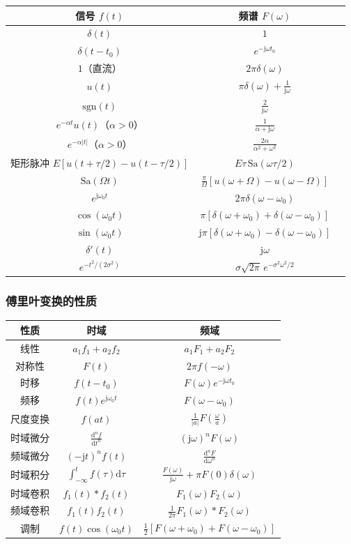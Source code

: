 \documentclass[11pt,a4paper]{ctexart}
\newcommand{\jj}{\mathrm{j}}            %
\newcommand{\dd}{\mathrm{d}}            %
\newcommand{\Sa}{\mathrm{Sa}}           %
\newcommand{\sgn}{\mathrm{sgn}}         %
\newcommand{\dirac}{\delta}             %
\begin{document}
\begin{tabular}{c|c|c}
\toprule
信号 $f(t)$ & 频谱 $F(\omega)$ \\
\midrule
$\dirac(t)$ & $1$ \\
$\dirac(t - t_0)$ & $e^{-\jj\omega t_0}$ \\
$1$（直流） & $2\pi\dirac(\omega)$ \\
$u(t)$ & $\pi\dirac(\omega) + \frac{1}{\jj\omega}$ \\
$\sgn(t)$ & $\frac{2}{\jj\omega}$ \\
$e^{-\alpha t}u(t)$（$\alpha > 0$）& $\frac{1}{\alpha + \jj\omega}$ \\
$e^{-\alpha|t|}$（$\alpha > 0$）& $\frac{2\alpha}{\alpha^2 + \omega^2}$ \\
矩形脉冲 $E[u(t+\tau/2)-u(t-\tau/2)]$ & $E\tau\,\Sa(\omega\tau/2)$ \\
$\Sa(\Omega t)$ & $\frac{\pi}{\Omega}[u(\omega+\Omega)-u(\omega-\Omega)]$ \\
$e^{\jj\omega_0 t}$ & $2\pi\dirac(\omega - \omega_0)$ \\
$\cos(\omega_0 t)$ & $\pi[\dirac(\omega+\omega_0) + \dirac(\omega-\omega_0)]$ \\
$\sin(\omega_0 t)$ & $\jj\pi[\dirac(\omega+\omega_0) - \dirac(\omega-\omega_0)]$ \\
$\dirac'(t)$ & $\jj\omega$ \\
$e^{-t^2/(2\sigma^2)}$ & $\sigma\sqrt{2\pi}\,e^{-\sigma^2\omega^2/2}$ \\
\bottomrule
\end{tabular}

\subsubsection{傅里叶变换的性质}

\begin{longtable}{c|c|c}
\toprule
性质 & 时域 & 频域 \\
\midrule
线性 & $a_1f_1 + a_2f_2$ & $a_1F_1 + a_2F_2$ \\
\midrule
对称性 & $F(t)$ & $2\pi f(-\omega)$ \\
\midrule
时移 & $f(t - t_0)$ & $F(\omega)e^{-\jj\omega t_0}$ \\
\midrule
频移 & $f(t)e^{\jj\omega_0 t}$ & $F(\omega - \omega_0)$ \\
\midrule
尺度变换 & $f(at)$ & $\frac{1}{|a|}F(\frac{\omega}{a})$ \\
\midrule
时域微分 & $\frac{\dd^n f}{\dd t^n}$ & $(\jj\omega)^n F(\omega)$ \\
\midrule
频域微分 & $(-\jj t)^n f(t)$ & $\frac{\dd^n F}{\dd\omega^n}$ \\
\midrule
时域积分 & $\int_{-\infty}^{t} f(\tau)\dd\tau$ & $\frac{F(\omega)}{\jj\omega} + \pi F(0)\dirac(\omega)$ \\
\midrule
时域卷积 & $f_1(t) * f_2(t)$ & $F_1(\omega)F_2(\omega)$ \\
\midrule
频域卷积 & $f_1(t)f_2(t)$ & $\frac{1}{2\pi}F_1(\omega) * F_2(\omega)$ \\
\midrule
调制 & $f(t)\cos(\omega_0 t)$ & $\frac{1}{2}[F(\omega+\omega_0) + F(\omega-\omega_0)]$ \\
\bottomrule
\end{longtable}
\end{document}
